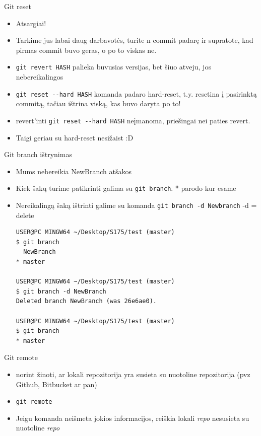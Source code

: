 \documentclass[11pt,xcolor=table]{beamer}
\begin{document}
\begin{frame}[fragile]{Git reset}
\begin{itemize}
\item Atsargiai! 
\item Tarkime jus labai daug darbavotės, turite n commit padarę ir supratote, kad pirmas commit buvo geras, o po to viskas ne.
\item \colorbox{listinggray}{\lstinline|git revert HASH|} palieka buvusias versijas, bet šiuo atveju, jos nebereikalingos
\item \colorbox{listinggray}{\lstinline|git reset --hard HASH|} komanda padaro hard-reset, t.y. resetina į pasirinktą commitą, tačiau ištrina viską, kas buvo daryta po to! 
\item revert'inti \colorbox{listinggray}{\lstinline|git reset --hard HASH|} neįmanoma, priešingai nei paties revert.
\item Taigi geriau su hard-reset nesižaist :D
\end{itemize}
\end{frame}


\begin{frame}[fragile]{Git branch ištrynimas}
\begin{itemize}
\item Mums nebereikia NewBranch atšakos
\item Kiek šakų turime patikrinti galima su \colorbox{listinggray}{\lstinline|git branch|}. * parodo kur esame
\item Nereikalingą šaką ištrinti galime su komanda \colorbox{listinggray}{\lstinline|git branch -d Newbranch|} -d = delete
\begin{lstlisting}
USER@PC MINGW64 ~/Desktop/S175/test (master)
$ git branch
  NewBranch
* master

USER@PC MINGW64 ~/Desktop/S175/test (master)
$ git branch -d NewBranch
Deleted branch NewBranch (was 26e6ae0).

USER@PC MINGW64 ~/Desktop/S175/test (master)
$ git branch
* master
\end{lstlisting}
\end{itemize}
\end{frame}


\begin{frame}{Git remote}
\begin{itemize}
\item norint žinoti, ar lokali repozitorija yra susieta su nuotoline repozitorija (pvz Github, Bitbucket ar pan)
\item \colorbox{listinggray}{\lstinline|git remote|}
\item Jeigu komanda neišmeta jokios informacijos, reiškia lokali \textit{repo} nesusieta su nuotoline \textit{repo}
\end{itemize}
\end{frame}
\end{document}
